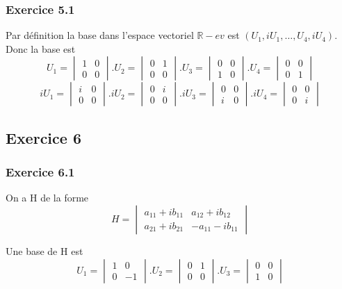 \documentclass[]{book}
\theoremstyle{definition}
\newcommand{\bb}[1]{\mathbb{#1}}
\newcommand{\R}{\bb{R}}
\begin{document}
\subsubsection*{Exercice 5.1}
Par d\'efinition la base dans l'espace vectoriel $\R-ev$ est $(U_1, iU_1, \ldots, U_4, iU_4)$.
Donc la base est
$$U_1 = \begin{vmatrix} 1 & 0 \\ 0 & 0 \end{vmatrix} . U_2 = \begin{vmatrix} 0 & 1 \\ 0 & 0 \end{vmatrix} . U_3 = \begin{vmatrix} 0 & 0 \\ 1 & 0 \end{vmatrix} . U_4 = \begin{vmatrix} 0 & 0 \\ 0 & 1 \end{vmatrix}$$
$$iU_1 = \begin{vmatrix} i & 0 \\ 0 & 0 \end{vmatrix} . iU_2 = \begin{vmatrix} 0 & i \\ 0 & 0 \end{vmatrix} . iU_3 = \begin{vmatrix} 0 & 0 \\ i & 0 \end{vmatrix} . iU_4 = \begin{vmatrix} 0 & 0 \\ 0 & i \end{vmatrix}$$

\subsection*{Exercice 6}
\subsubsection*{Exercice 6.1}
On a H de la forme
$$
H = \begin{vmatrix} a_{11} + ib_{11} & a_{12} + ib_{12} \\ a_{21} + ib_{21} & -a_{11} - ib_{11} \end{vmatrix}
$$

Une base de H est 
$$U_1 = \begin{vmatrix} 1 & 0 \\ 0 & -1 \end{vmatrix} . U_2 = \begin{vmatrix} 0 & 1 \\ 0 & 0 \end{vmatrix} . U_3 = \begin{vmatrix} 0 & 0 \\ 1 & 0 \end{vmatrix}$$
\end{document}
